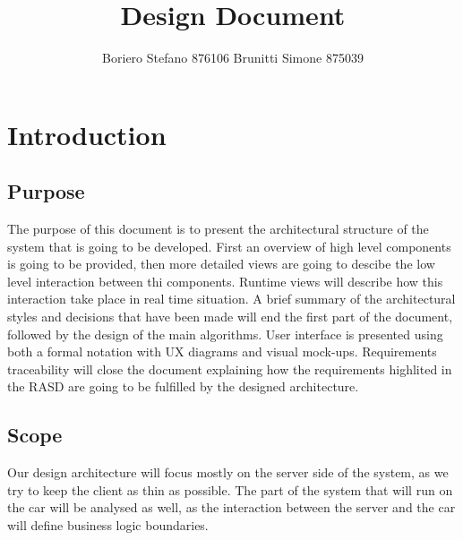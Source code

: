\documentclass{article}
\begin{document}
\title{Design Document}
\author{Boriero Stefano  876106  
Brunitti Simone   875039 }


\maketitle

\tableofcontents

\section{Introduction}
\subsection{Purpose}
The purpose of this document is to present the architectural structure of the system that is going to be developed. First an overview of high level components is going to be provided, then more detailed views are going to descibe the low level interaction between thi components. Runtime views will describe how this interaction take place in real time situation. A brief summary of the architectural styles and decisions that have been made will end the first part of the document, followed by the design of the main algorithms.  
User interface is presented using both a formal notation with UX diagrams and visual mock-ups.  
Requirements traceability will close the document explaining how the requirements highlited in the RASD are going to be fulfilled by the designed architecture. 
\subsection{Scope}
Our design architecture will focus mostly on the server side of the system, as we try to keep the client as thin as possible. The part of the system that will run on the car will be analysed as well, as the interaction between the server and the car will define business logic boundaries.
\end{document}
